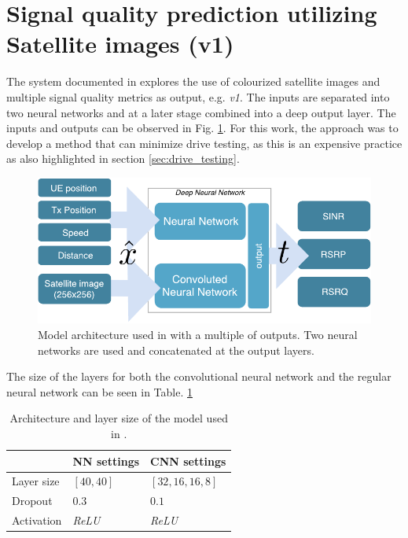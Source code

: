 \section{Signal quality prediction utilizing Satellite images (v1)}\label{sec:initial_v1}
The system documented in \cite{Thrane2018DriveApproximation} explores the use of colourized satellite images and multiple signal quality metrics as output, e.g. \emph{v1}. The inputs are separated into two neural networks and at a later stage combined into a deep output layer. The inputs and outputs can be observed in Fig. \ref{fig:dnn_architecture_drive_test_minimization}. For this work, the approach was to develop a method that can minimize drive testing, as this is an expensive practice as also highlighted in section \ref{sec:drive_testing}.

\begin{figure}
    \centering
    \includegraphics{chapters/part_pathloss/drive_test_minimzation_paper/input_output_figure.pdf}
    \caption{Model architecture used in \cite{Thrane2018DriveApproximation} with a multiple of outputs. Two neural networks are used and concatenated at the output layers.}
    \label{fig:dnn_architecture_drive_test_minimization}
\end{figure}

The size of the layers for both the convolutional neural network and the regular neural network can be seen in Table. \ref{tab:dnn_architecture_drive_test_minimization}

\begin{table}[ht]
  \centering
  \caption{Architecture and layer size of the model used in \cite{Thrane2018DriveApproximation}.}
  \label{tab:dnn_architecture_drive_test_minimization}
  \begin{tabular}{l|l|l}
                & NN settings     & CNN settings      \\ \hline
  Layer size & $[40, 40]$      & $[32, 16, 16, 8]$ \\
  Dropout       & $0.3$           & $0.1$             \\
  Activation    & \textit{ReLU} & \textit{ReLU}  
\end{tabular}
\end{table}

